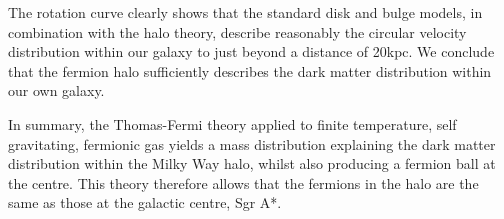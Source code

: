 The rotation curve clearly shows that the standard disk and bulge models, in combination with the halo theory, describe reasonably the circular
velocity distribution within our galaxy to just beyond a distance of 20kpc. We conclude that the fermion halo sufficiently describes the dark
matter distribution within our own galaxy.

In summary, the Thomas-Fermi theory applied to finite temperature, self gravitating, fermionic gas yields a mass distribution
explaining the dark matter distribution within the Milky Way halo, whilst also producing a fermion ball at the centre. This theory therefore
allows that the fermions in the halo are the same as those at the galactic centre, Sgr A*.
